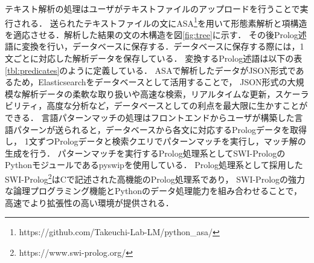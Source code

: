 \documentclass{FITpaper}
\begin{document}
テキスト解析の処理はユーザがテキストファイルのアップロードを行うことで実行される．
送られたテキストファイルの文にASA\footnote{https://github.com/Takeuchi-Lab-LM/python\_asa/}を用いて形態素解析と項構造を適応させる．解析した結果の文の木構造を図\ref{fig:tree}に示す．
その後Prolog述語に変換を行い，データベースに保存する．データベースに保存する際には，1文ごとに対応した解析データを保存している．
変換するProlog述語は以下の表\ref{tbl:predicates}のように定義している．%
ASAで解析したデータがJSON形式であるため，Elasticsearchをデータベースとして活用することで，
JSON形式の大規模な解析データの柔軟な取り扱いや高速な検索，リアルタイムな更新，スケーラビリティ，高度な分析など，データベースとしての利点を最大限に生かすことができる．
言語パターンマッチの処理はフロントエンドからユーザが構築した言語パターンが送られると，データベースから各文に対応するPrologデータを取得し，
1文ずつPrologデータと検索クエリでパターンマッチを実行し，マッチ解の生成を行う．
パターンマッチを実行するProlog処理系としてSWI-PrologのPythonモジュールであるpyswipを使用している．
Prolog処理系として採用したSWI-Prolog\footnote{https://www.swi-prolog.org/}はCで記述された高機能のProlog処理系であり，
SWI-Prologの強力な論理プログラミング機能とPythonのデータ処理能力を組み合わせることで，高速でより拡張性の高い環境が提供される．







\end{document}
